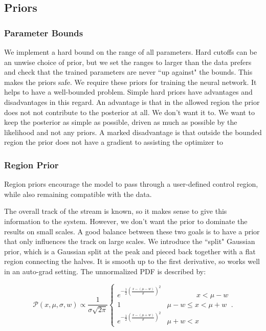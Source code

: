 \documentclass[twocolumn]{aastex631}
\newcommand{\mcal}[1]{\mathcal{#1}}
\newcommand{\Exp}[1]{e^{#1}}
\newcommand{\pdf}{\mcal{P}}
\begin{document}
    \subsection{Priors} \label{sub:priors}


        \subsubsection{Parameter Bounds}

            We implement a hard bound on the range of all parameters.
            Hard cutoffs can be an unwise choice of prior, but we set the ranges to larger than the data prefers and check that the trained parameters are never ``up against" the bounds.
            This makes the priors safe.
            We require these priors for training the neural network. It helps to have a well-bounded problem. Simple hard priors have advantages and disadvantages in this regard.
            An advantage is that in the allowed region the prior does not not contribute to the posterior at all. We don't want it to. We want to keep the posterior as simple as possible, driven as much as possible by the likelihood and not any priors.
            A marked disadvantage is that outside the bounded region the prior does not have a gradient to assisting the optimizer to 


        \subsubsection{Region Prior} \label{sub:track_region_prior}

            Region priors encourage the model to pass through a user-defined control region, while also remaining compatible with the data.

            The overall track of the stream is known, so it makes sense to give this information to the system. However, we don't want the prior to dominate the results on small scales. A good balance between these two goals is to have a prior that only influences the track on large scales.
            We introduce the ``split" Gaussian prior, which is a Gaussian split at the peak and pieced back together with a flat region connecting the halves. 
            It is smooth up to the first derivative, so works well in an auto-grad setting.
            The unnormalized PDF is described by:
            \begin{small}
            \begin{equation}
                \pdf(x,\mu,\sigma,w) \propto  \frac{1}{\sigma \sqrt{2 \pi}} \begin{cases} 
                   \Exp{-\frac{1}{2}\left(\frac{x-(\mu-w)}{\sigma}\right)^2} & \phantom{\mu - w <}\ x < \mu - w \\
                    1 & \mu - w \leq x < \mu + w \\
                    \Exp{-\frac{1}{2}\left(\frac{x-(\mu+w)}{\sigma}\right)^2} & \mu + w < x
                \end{cases}.
            \end{equation}\end{small}
    
\end{document}
